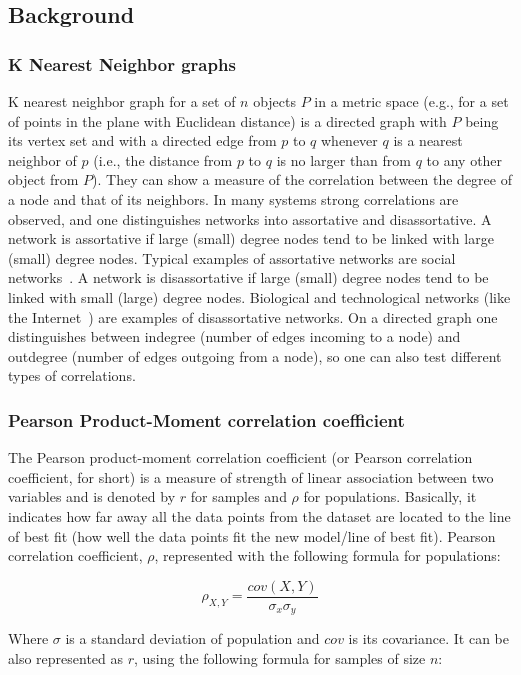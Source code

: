 \subsection{Background}
\subsubsection{K Nearest Neighbor graphs}
K nearest neighbor graph for a set of $n$ objects $P$ in a metric space (e.g., for a set of points in the plane with Euclidean distance) is a directed graph with $P$ being its vertex set and with a directed edge from $p$ to $q$ whenever $q$ is a nearest neighbor of $p$ (i.e., the distance from $p$ to $q$ is no larger than from $q$ to any other object from $P$).
They can show a measure of the correlation between the degree of a node and that of its neighbors.
In many systems strong correlations are observed, and one distinguishes networks into assortative and disassortative.
A network is assortative if large (small) degree nodes tend to be linked with large (small) degree nodes.
Typical examples of assortative networks are social networks~\cite{information_or_social_network}.
A network is disassortative if large (small) degree nodes tend to be linked with small (large) degree nodes.
Biological and technological networks (like the Internet~\cite{lecture_sergei_maslov_internet}) are examples of disassortative networks.
On a directed graph one distinguishes between indegree (number of edges incoming to a node) and outdegree (number of edges outgoing from a node), so one can also test different types of correlations.

\subsubsection{Pearson Product-Moment correlation coefficient}

The Pearson product-moment correlation coefficient (or Pearson correlation coefficient, for short) is a measure of strength of linear association between two variables and is denoted by $r$ for samples and $\rho$ for populations.
Basically, it indicates how far away all the data points from the dataset are located to the line of best fit (how well the data points fit the new model/line of best fit).
Pearson correlation coefficient, $\rho$, represented with the following formula for populations:

$$ \rho_{X,Y} = \frac{cov(X,Y)}{\sigma_x \sigma_y}$$

Where $\sigma$ is a standard deviation of population and $cov$ is its covariance.
It can be also represented as $r$, using the following formula for samples of size $n$:

